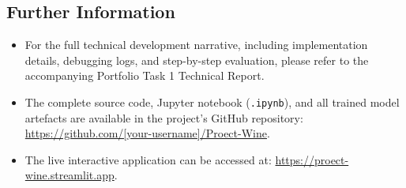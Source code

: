 \documentclass[11pt,a4paper]{article}
\begin{document}
\subsection{Further Information}

\begin{itemize}[leftmargin=*]
    \item For the full technical development narrative, including implementation details, debugging logs, and step-by-step evaluation, please refer to the accompanying Portfolio Task 1 Technical Report.
    \item The complete source code, Jupyter notebook (\texttt{.ipynb}), and all trained model artefacts are available in the project's GitHub repository: \url{https://github.com/[your-username]/Proect-Wine}.
    \item The live interactive application can be accessed at: \url{https://proect-wine.streamlit.app}.
\end{itemize}
\end{document}
